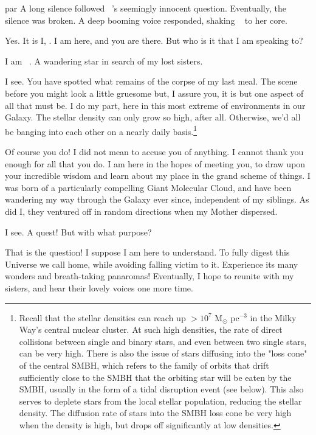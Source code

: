 \documentclass[main.tex]{subfiles}
\begin{document}
par \nar A long silence followed \rmelectra~'s seemingly innocent question.  Eventually, the silence was broken. A deep booming voice responded, shaking \rmelectra~ to her core.

\par \Chiron Yes.  It is I, \rmchiron.  I am here, and you are there.  But who is it that I am speaking to?

\par \Electra I am \rmelectra~.  A wandering star in search of my lost sisters.

\par \Chiron I see.  You have spotted what remains of the corpse of my last meal.  The scene before you might look a little gruesome but, I assure you, it is but one aspect of all that must be.  I do my part, here in this most extreme of environments in our Galaxy.  The stellar density can only grow so high, after all.  Otherwise, we'd all be banging into each other on a nearly daily basis.\footnote{Recall that the stellar densities can reach up $> 10^7$ M$_{\odot}$ pc$^{-3}$ in the Milky Way's central nuclear cluster.  At such high densities, the rate of direct collisions between single and binary stars, and even between two single stars, can be very high.  There is also the issue of stars diffusing into the "loss cone" of the central SMBH, which refers to the family of orbits that drift sufficiently close to the SMBH that the orbiting star will be eaten by the SMBH, usually in the form of a tidal disruption event (see below).  This also serves to deplete stars from the local stellar population, reducing the stellar density.  The diffusion rate of stars into the SMBH loss cone be very high when the density is high, but drops off significantly at low densities.} 

\par \Electra Of course you do!  I did not mean to accuse you of anything.  I cannot thank you enough for all that you do.  I am here in the hopes of meeting you, to draw upon your incredible wisdom and learn about my place in the grand scheme of things.  I was born of a particularly compelling Giant Molecular Cloud, and have been wandering my way through the Galaxy ever since, independent of my siblings.  As did I, they ventured off in random directions when my Mother dispersed.

\par \Chiron I see.  A quest!  But with what purpose?

\par \Electra That is the question!  I suppose I am here to understand.  To fully digest this Universe we call home, while avoiding falling victim to it.  Experience its many wonders and breath-taking panaromas!  Eventually, I hope to reunite with my sisters, and hear their lovely voices one more time.
\end{document}
